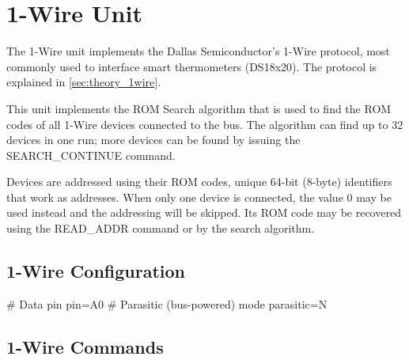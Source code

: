 \section{1-Wire Unit}

The 1-Wire unit implements the Dallas Semiconductor's 1-Wire protocol, most commonly used to interface smart thermometers (DS18x20). The protocol is explained in \cref{sec:theory_1wire}.

This unit implements the ROM Search algorithm that is used to find the ROM codes of all 1-Wire devices connected to the bus. The algorithm can find up to 32 devices in one run; more devices can be found by issuing the SEARCH\_CONTINUE command.

Devices are addressed using their ROM codes, unique 64-bit (8-byte) identifiers that work as addresses. When only one device is connected, the value 0 may be used instead and the addressing will be skipped. Its ROM code may be recovered using the READ\_ADDR command or by the search algorithm.

\subsection{1-Wire Configuration}

\begin{inicode}
[1WIRE:ow@7]
# Data pin
pin=A0
# Parasitic (bus-powered) mode
parasitic=N
\end{inicode}

\subsection{1-Wire Commands}

